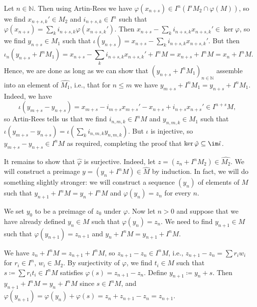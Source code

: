 Let $n \in \mathbb{N}$. Then using Artin-Rees we have
$\varphi(x_{n+s}) \in I^n(I^sM_2\cap \varphi(M))$, so we find
$x_{n+s,k}' \in M_2$ and $i_{n+s,k} \in I^n$ such that
$\varphi(x_{n+s}) = \sum_k i_{n+s,k}\varphi(x_{n+s,k}')$. Then
$x_{n+s} - \sum_k i_{n+s,k}x_{n+s,k}' \in \ker\varphi$, so we find $y_{n+s} \in M_1$ such
that $\iota(y_{n+s}) = x_{n+s} - \sum_k i_{n+s,k}x_{n+s,k}'$. But then
\[ \iota_n(y_{n+s} + I^nM_1) = x_{n+s} - \sum_k i_{n+s,k}x_{n+s,k}' + I^nM = x_{n+s} + I^nM = x_n + I^nM. \]
Hence, we are done as long as we can show that $(y_{n+s} + I^nM_1)_{n \in \mathbb{N}}$
assemble into an element of $\hat{M_1}$, i.e., that for $n\leq m$ we have
$y_{m+s} + I^nM_1 = y_{n+s} + I^nM_1$. Indeed, we have
\[ \iota(y_{m+s} - y_{n+s}) = x_{m+s} - i_{m+s}x_{m+s}' - x_{n+s} + i_{n+s}x_{n+s}' \in I^{n+s}M, \]
so Artin-Rees tells us that we find $i_{n, m, k} \in I^nM$ and $y_{n, m, k} \in M_1$ such
that $\iota(y_{m+s} - y_{n+s}) = \iota(\sum_k i_{n, m,k}y_{n, m,k})$. But $\iota$ is injective,
so $y_{m+s} - y_{n+s} \in I^nM$ as required, completing the proof that
$\ker\hat{\varphi} \subseteq \im\hat{\iota}$.

It remains to show that $\hat{\varphi}$ is surjective.
Indeed, let $z = (z_n + I^nM_2) \in \hat{M_2}$. We will construct a preimage
$y = (y_n + I^nM) \in \hat{M}$ by induction. In fact, we will do something slightly
stronger: we will construct a sequence $(y_n)$ of elements of $M$ such that
$y_{n+1} + I^nM = y_n + I^nM$ and $\varphi(y_n) = z_n$ for every $n$.

We set $y_0$ to be a preimage of $z_0$ under $\varphi$. Now let $n > 0$
and suppose that we have already defined $y_n \in M$ such that
$\varphi(y_n) = z_n$. We need to find $y_{n+1} \in M$ such
that $\varphi(y_{n+1}) = z_{n+1}$ and $y_n + I^nM = y_{n+1} + I^nM$.

We have $z_n + I^nM = z_{n+1} + I^nM$, so $z_{n+1} - z_n \in I^nM$, i.e.,
$z_{n + 1} - z_n = \sum r_iw_i$ for $r_i \in I^n$, $w_i \in M_2$. By surjectivity
of $\varphi$, we find $t_i \in M$ such that $s\coloneqq \sum r_it_i \in I^nM$ satisfies
$\varphi(s) = z_{n + 1} - z_n$. Define $y_{n+1}\coloneqq y_n + s$. Then $y_{n+1} + I^nM = y_n + I^nM$
since $s \in I^nM$,
and $\varphi(y_{n+1}) = \varphi(y_n) + \varphi(s) = z_n + z_{n+1} - z_n = z_{n+1}$.
